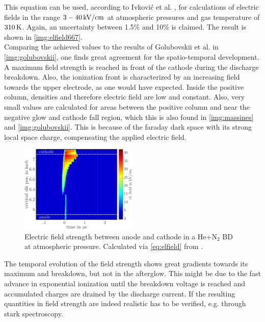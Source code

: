 \documentclass[a4paper,10pt,twoside]{article}
\begin{document}
		This equation can be used, according to Ivkovi{\'c} et al. \cite{linratio1_14}, for calculations of electric fields in the range $\unit[3-40]{kV/cm}$ at atmospheric pressures and gas temperature of $\unit[310]{K}$. Again, an uncertainty between 1.5\% \newline and 10\% is claimed. The result is shown in \autoref{img:elfield667}.\\
		Comparing the achieved values to the results of Golubovskii et al. \cite{0022-3727-36-1-306} in \autoref{img:golubovskii}, one finds great agreement for the spatio-temporal development. A maximum field strength is reached in front of the cathode during the discharge breakdown. Also, the ionization front is characterized by an increasing field towards the upper electrode, as one would have expected. Inside the positive column, densities and therefore electric field are low and constant. Also, very small values are calculated for areas between the positive column and near the negative glow and cathode fall region, which this is also found in \autoref{img:massines} and \autoref{img:golubovskii}. This is because of the faraday dark space with its strong local space charge, compensating the applied electric field.
		
			\begin{figure}[t!]
				\centering
				\hspace{0.5cm}\includegraphics[width=0.5\textwidth]{figures/lineratio/combinations/electricfield667.pdf}
				\caption{Electric field strength between anode and cathode in a He+N$_2$ BD at atmospheric pressure. Calculated via \autoref{eq:elfield} from \cite{linratio1_14}.}
				\label{img:elfield667}
			\end{figure}
		
		The temporal evolution of the field strength shows great gradients towards its maximum and breakdown, but not in the afterglow. This might be due to the fast advance in exponential ionization until the breakdown voltage is reached and accumulated charges are drained by the discharge current. If the resulting quantities in field strength are indeed realistic has to be verified, e.g. through stark spectroscopy.
\end{document}
